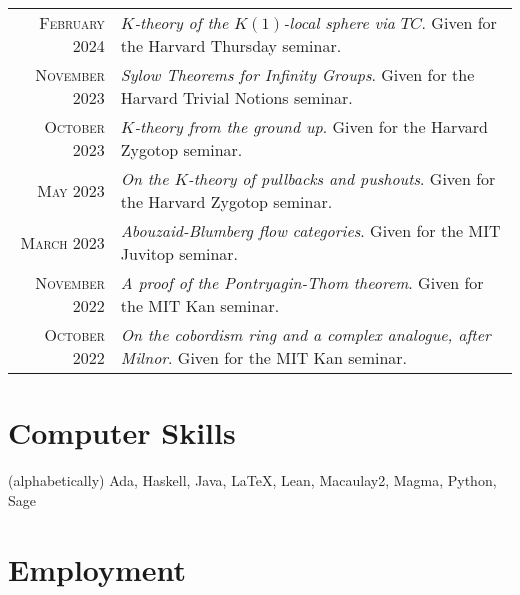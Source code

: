\documentclass[a4paper,10pt]{article} %
\begin{document}
\begin{tabular}{rl}

\textsc{February} 2024 & \emph{$K$-theory of the $K(1)$-local sphere via $TC$}. Given for the Harvard Thursday seminar.\\

\textsc{November} 2023 & \emph{Sylow Theorems for Infinity Groups}. Given for the Harvard Trivial Notions seminar.\\

\textsc{October} 2023 & \emph{$K$-theory from the ground up}. Given for the Harvard Zygotop seminar.\\

\textsc{May} 2023 & \emph{On the $K$-theory of pullbacks and pushouts}. Given for the Harvard Zygotop seminar.\\

\textsc{March} 2023 & \emph{Abouzaid-Blumberg flow categories}. Given for the MIT Juvitop seminar.\\

\textsc{November} 2022 & \emph{A proof of the Pontryagin-Thom theorem}. Given for the MIT Kan seminar.\\

\textsc{October} 2022 & \emph{On the cobordism ring and a complex analogue, after Milnor}. Given for the MIT Kan seminar.

\end{tabular}



\section{Computer Skills}

(alphabetically) Ada, Haskell, Java, {\fb \LaTeX}, Lean, Macaulay2, Magma, Python, Sage


\section{Employment}
\end{document}

